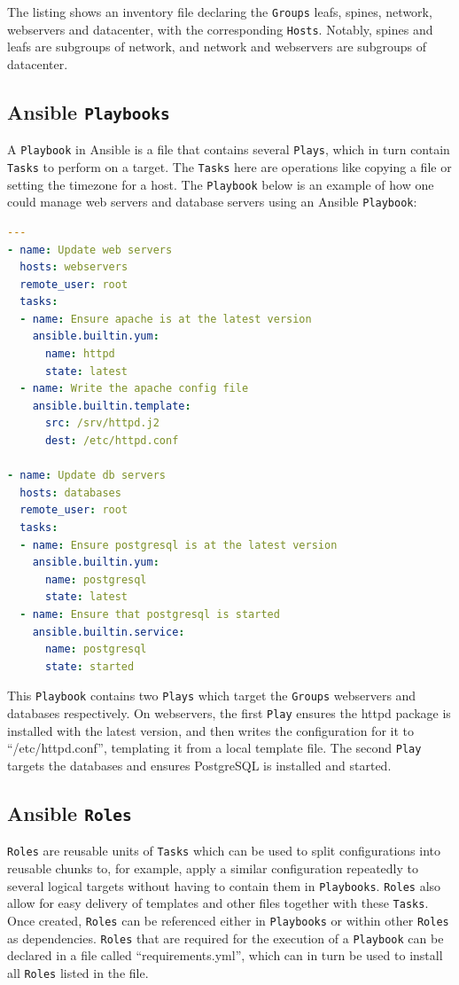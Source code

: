 The listing shows an inventory file declaring the \texttt{Groups} leafs, spines, network, webservers and datacenter, with the corresponding \texttt{Hosts}.
Notably, spines and leafs are subgroups of network, and network and webservers are subgroups of datacenter.


\subsection{Ansible \texttt{Playbooks}}
A \texttt{Playbook} in Ansible is a file that contains several \texttt{Plays}, which in turn contain \texttt{Tasks} to perform on a target.
The \texttt{Tasks} here are operations like copying a file or setting the timezone for a host.
The \texttt{Playbook} below is an example of how one could manage web servers and database servers using an Ansible \texttt{Playbook}:

\begin{lstlisting}[language=yaml,caption=Ansible \texttt{Playbook} example (source: \cite{ansibleplaybooks})]
---
- name: Update web servers
  hosts: webservers
  remote_user: root
  tasks:
  - name: Ensure apache is at the latest version
    ansible.builtin.yum:
      name: httpd
      state: latest
  - name: Write the apache config file
    ansible.builtin.template:
      src: /srv/httpd.j2
      dest: /etc/httpd.conf

- name: Update db servers
  hosts: databases
  remote_user: root
  tasks:
  - name: Ensure postgresql is at the latest version
    ansible.builtin.yum:
      name: postgresql
      state: latest
  - name: Ensure that postgresql is started
    ansible.builtin.service:
      name: postgresql
      state: started
\end{lstlisting}
This \texttt{Playbook} contains two \texttt{Plays} which target the \texttt{Groups} webservers and databases respectively.
On webservers, the first \texttt{Play} ensures the httpd package is installed with the latest version, and then writes the configuration for it to \enquote{/etc/httpd.conf}, templating it from a local template file.
The second \texttt{Play} targets the databases and ensures PostgreSQL is installed and started.
\parencite{ansibleplaybooks}

\subsection{Ansible \texttt{Roles}}
\texttt{Roles} are reusable units of \texttt{Tasks} which can be used to split configurations into reusable chunks to, for example, apply a similar configuration repeatedly to several logical targets without having to contain them in \texttt{Playbooks}.
\texttt{Roles} also allow for easy delivery of templates and other files together with these \texttt{Tasks}.
Once created, \texttt{Roles} can be referenced either in \texttt{Playbooks} or within other \texttt{Roles} as dependencies.
\texttt{Roles} that are required for the execution of a \texttt{Playbook} can be declared in a file called \enquote{requirements.yml}, which can in turn be used to install all \texttt{Roles} listed in the file.
\parencite{ansibleroles, ansiblegalaxyuserguide}
